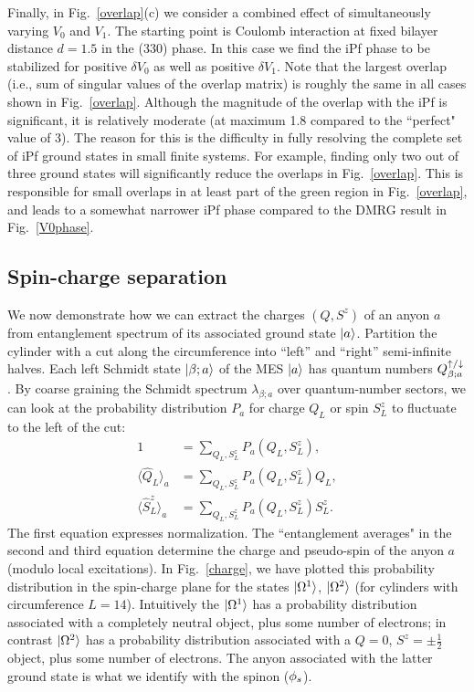 Finally, in Fig.~\ref{overlap}(c) we consider a combined effect of simultaneously varying $V_0$ and $V_1$. The starting point is Coulomb interaction at fixed bilayer distance $d=1.5$ in the (330) phase. In this case we find the iPf phase to be stabilized for positive $\delta V_0$ as well as positive $\delta V_1$. Note that the largest overlap (i.e., sum of singular values of the overlap matrix) is roughly the same  in all cases shown in Fig.~\ref{overlap}. Although the magnitude of the overlap with the iPf is significant, it is relatively moderate (at maximum 1.8 compared to the ``perfect" value of 3). The reason for this is the difficulty in fully resolving the complete set of iPf ground states in small finite systems. For example, finding only two out of three ground states will significantly reduce the overlaps in Fig.~\ref{overlap}. This is responsible for small overlaps in at least part of the green region in Fig.~\ref{overlap}, and leads to a somewhat narrower iPf phase compared to the DMRG result in Fig.~\ref{V0phase}.


\subsection{Spin-charge separation}\label{sec:scsep}

We now demonstrate how we can extract the charges $(Q, S^z)$ of an anyon $a$ from entanglement spectrum of its associated ground state $\ket{a}$.
Partition  the cylinder with a cut along the circumference into ``left'' and ``right'' semi-infinite halves.
Each left Schmidt state $\ket{\beta; a}$ of the MES $\ket{a}$ has quantum numbers $Q^{\uparrow/\downarrow}_{\beta; a}$.
By coarse graining the Schmidt spectrum $\lambda_{\beta; a}$ over quantum-number sectors, we can look at the probability distribution $P_a$ for charge $Q_L$ or spin $S_L^z$ to fluctuate to the left of the cut:
\begin{subequations}\begin{align}
	1 &=  \sum_{Q_L , S^z_L }  P_a(Q_L, S^z_L ) ,\\
	\langle \hat{Q}_L \rangle_a &= \sum_{Q_L, S^z_L }  P_a(Q_L, S^z_L ) Q_L, \\
	\langle \hat{S}^z_L \rangle_a &= \sum_{Q_L , S^z_L }    P_a(Q_L , S^z_L) S^z_L .
\end{align}\end{subequations}
The first equation expresses normalization.
The ``entanglement averages" in the second and third equation determine the charge and pseudo-spin of the anyon $a$ (modulo local excitations).
In Fig.~\ref{charge}, we have plotted this probability distribution in the spin-charge plane for the states $\ket{\Omega^1}$, $\ket{\Omega^2}$ (for cylinders with circumference $L=14$).
Intuitively the $\ket{\Omega^1}$ has a probability distribution associated with a completely neutral object, plus some number of electrons; in contrast $\ket{\Omega^2}$ has a probability distribution associated with a $Q = 0$, $S^z = \pm \frac{1}{2}$ object, plus some number of electrons.
The anyon associated with the latter ground state is what we identify with the spinon (${\phi_s}$).

